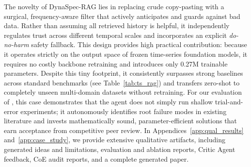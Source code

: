 The novelty of DynaSpec-RAG lies in replacing crude copy-pasting with a surgical, frequency-aware filter that actively anticipates and guards against bad data. Rather than assuming all retrieved history is helpful, it independently regulates trust across different temporal scales and incorporates an explicit \emph{do-no-harm} safety fallback. This design provides high practical contribution: because it operates strictly on the output space of frozen time-series foundation models, it requires no costly backbone retraining and introduces only 0.27M trainable parameters. Despite this tiny footprint, it consistently surpasses strong baselines across standard benchmarks (see Table~\ref{tab:ts_rag}) and transfers zero-shot to completely unseen multi-domain datasets without retraining. For our evaluation of \sname, this case demonstrates that the agent does not simply run shallow trial-and-error experiments; it autonomously identifies root failure modes in existing literature and invests mathematically sound, parameter-efficient solutions that earn acceptance from competitive peer review.
In Appendices~\ref{app:qual_results} and~\ref{app:case_study}, we provide extensive qualitative artifacts, including generated ideas and limitations, evaluation and ablation reports, Critic Agent feedback, CoE audit reports, and a complete generated paper.

% 

% 

